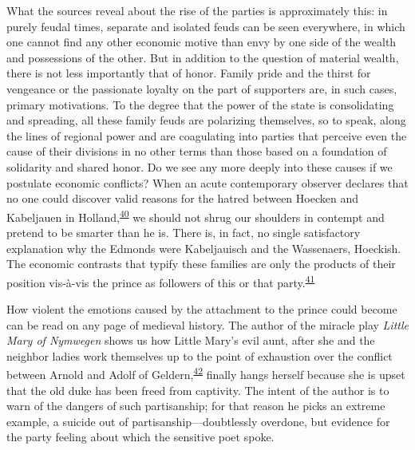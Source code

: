 What the sources reveal about the rise of the parties is approximately
this: in purely feudal times, separate and isolated feuds can be seen
everywhere, in which one cannot find any other economic motive than envy
by one side of the wealth and possessions of the other. But in addition
to the question of material wealth, there is not less importantly that
of honor. Family pride and the thirst for vengeance or the passionate
loyalty on the part of supporters are, in such cases, primary
motivations. To the degree that the power
\protect\hypertarget{08_Chapter_One__THE_PASSIONATE_INTE.xhtmlux5cux23page_18}{}{}of
the state is consolidating and spreading, all these family feuds are
polarizing themselves, so to speak, along the lines of regional power
and are coagulating into parties that perceive even the cause of their
divisions in no other terms than those based on a foundation of
solidarity and shared honor. Do we see any more deeply into these causes
if we postulate economic conflicts? When an acute contemporary observer
declares that no one could discover valid reasons for the hatred between
Hoecken and Kabeljauen in
Holland,\textsuperscript{\protect\hypertarget{08_Chapter_One__THE_PASSIONATE_INTE.xhtmlux5cux23id_2151}{\protect\hyperlink{23_NOTES.xhtmlux5cux23id_2152}{40}}}
we should not shrug our shoulders in contempt and pretend to be smarter
than he is. There is, in fact, no single satisfactory explanation why
the Edmonds were Kabeljauisch and the Wassenaers, Hoeckish. The economic
contrasts that typify these families are only the products of their
position vis-à-vis the prince as followers of this or that
party.\textsuperscript{\protect\hypertarget{08_Chapter_One__THE_PASSIONATE_INTE.xhtmlux5cux23id_2149}{\protect\hyperlink{23_NOTES.xhtmlux5cux23id_2150}{41}}}

How violent the emotions caused by the attachment to the prince could
become can be read on any page of medieval history. The author of the
miracle play \emph{Little Mary of Nymwegen} shows us how Little Mary's
evil aunt, after she and the neighbor ladies work themselves up to the
point of exhaustion over the conflict between Arnold and Adolf of
Geldern,\textsuperscript{\protect\hypertarget{08_Chapter_One__THE_PASSIONATE_INTE.xhtmlux5cux23id_2147}{\protect\hyperlink{23_NOTES.xhtmlux5cux23id_2148}{42}}}
finally hangs herself because she is upset that the old duke has been
freed from captivity. The intent of the author is to warn of the dangers
of such partisanship; for that reason he picks an extreme example, a
suicide out of partisanship---doubtlessly overdone, but evidence for the
party feeling about which the sensitive poet spoke.

